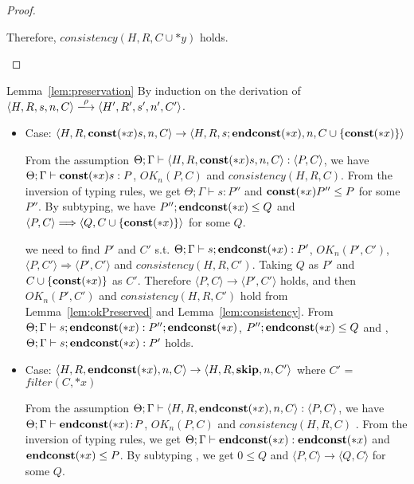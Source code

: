 \begin{proof}
\begin{itemize}
  Therefore, \(consistency(H, R, C\cup{*y})\) holds.
  

 \end{itemize}
\end{proof}


\begin{pfof}{Lemma~\ref{lem:preservation}}
By induction on the derivation of \(\langle H, R, s, n, C \rangle
\xlongrightarrow{\rho} \langle H' ,R' ,s', n', C' \rangle\).

\begin{itemize}

\item Case: \( \langle H, R, \mathbf{const}(*x) s, n, C \rangle
  \rightarrow \langle H, R, s;\mathbf{endconst}(*x), n, C\cup
  \{\mathbf{const}(*x)\} \rangle \)

  From the assumption \( \Theta; \Gamma \vdash \langle H, R,
  \mathbf{const}(*x) s, n, C \rangle : \langle P, C \rangle\), we have \(
  \Theta; \Gamma \vdash \mathbf{const}(*x) s: P \), \( OK_n(P, C) \) and
  \(consistency(H, R, C)\). From the inversion of typing rules, we get
  \( \Theta; \Gamma \vdash s:P'' \) and \( \mathbf{const}(*x) P'' \le P \) for
  some \( P'' \). By subtyping, we have \( P'';\mathbf{endconst}(*x) \le Q \) and
  \( \langle P, C \rangle \Longrightarrow \langle Q, C\cup
  \{\mathbf{const}(*x)\} \rangle \) for some \( Q \).

  we need to find \(P'\) and \(C'\) s.t. \( \Theta; \Gamma \vdash
  s;\mathbf{endconst}(*x):P'\), \( OK_n(P', C')\), \( \langle P, C' \rangle
  \Longrightarrow \langle P', C' \rangle \) and \(consistency(H, R,
  C')\). Taking \( Q \) as \( P'\) and \( C \cup \{\mathbf{const}(*x)\} \) as
  \(C'\). Therefore \( \langle P, C \rangle \rightarrow \langle P', C'
  \rangle\) holds, and then \( OK_n(P', C')\) and \(consistency(H, R,
  C')\) hold from Lemma~\ref{lem:okPreserved} and
  Lemma~\ref{lem:consistency}. From \( \Theta; \Gamma \vdash
  s;\mathbf{endconst}(*x):P'';\mathbf{endconst}(*x) \), \( P'';\mathbf{endconst}(*x) \le Q \) and
  , \( \Theta; \Gamma \vdash s;\mathbf{endconst}(*x):P'\) holds.

\item Case: \( \langle H, R, \mathbf{endconst}(*x), n, C \rangle \rightarrow
  \langle H, R, \mathbf{skip}, n, C' \rangle \) where \(C'\) = \(filter(C,
  *x)\)

   From the assumption \( \Theta; \Gamma \vdash \langle H, R,
   \mathbf{endconst}(*x), n, C \rangle : \langle P, C \rangle\), we have \(
   \Theta; \Gamma \vdash \mathbf{endconst}(*x) \!:\! P\), \( OK_n(P, C) \) and
   \(consistency(H, R, C)\) . From the inversion of typing rules, we
   get \( \Theta; \Gamma \vdash \mathbf{endconst}(*x):\mathbf{endconst}(*x) \) and \(
   \mathbf{endconst}(*x) \le P \). By subtyping , we get \( 0 \le Q \) and \(
   \langle P, C \rangle \rightarrow \langle Q, C \rangle\) for some
   \( Q \).


\end{itemize}
\end{pfof}
